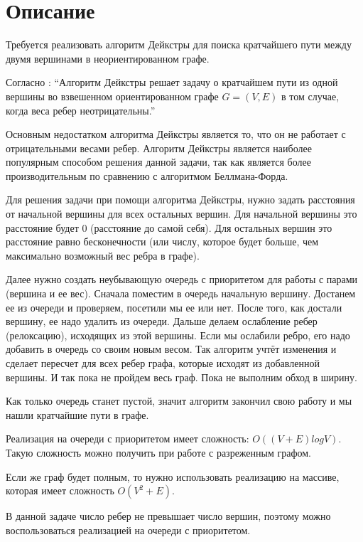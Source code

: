 \section{Описание}

Требуется реализовать алгоритм Дейкстры для поиска кратчайшего пути между двумя вершинами в неориентированном графе.

Согласно \cite{Kormen}: \enquote{Алгоритм Дейкстры решает задачу о кратчайшем пути из одной вершины во
взвешенном ориентированном графе $G = (V, E)$ в том случае, когда веса ребер
неотрицательны.}

Основным недостатком алгоритма Дейкстры является то, что он не работает с отрицательными весами ребер.
Алгоритм Дейкстры является наиболее популярным способом решения данной задачи, так как является более
производительным по сравнению с алгоритмом Беллмана-Форда.

Для решения задачи при помощи алгоритма Дейкстры, нужно задать расстояния от начальной вершины для всех остальных
вершин. Для начальной вершины это расстояние будет $0$ (расстояние до самой себя). Для остальных 
вершин это расстояние равно бесконечности (или числу, которое будет больше, чем максимально возможный вес ребра 
в графе). 

Далее нужно создать неубывающую очередь с приоритетом для работы с парами (вершина и ее вес). Сначала поместим 
в очередь начальную вершину. Достанем ее из очереди и проверяем, посетили мы ее или нет. После того, как достали
вершину, ее надо удалить из очереди. Дальше делаем ослабление ребер (релоксацию), исходящих из этой 
вершины. Если мы ослабили ребро, его надо добавить в очередь со своим новым весом. Так алгоритм учтёт изменения
 и сделает пересчет для всех ребер графа, которые исходят из добавленной вершины. И так пока не пройдем весь граф.
Пока не выполним обход в ширину.

Как только очередь станет пустой, значит алгоритм закончил свою работу и мы нашли кратчайшие пути в графе.

Реализация на очереди с приоритетом имеет сложность: $O((V+E)logV)$. Такую сложность можно получить при
работе с разреженным графом.

Если же граф будет полным, то нужно использовать реализацию на массиве, которая имеет сложность $O(V^2 + E)$.

В данной задаче число ребер не превышает число вершин, поэтому можно воспользоваться реализацией на 
очереди с приоритетом.

\pagebreak

